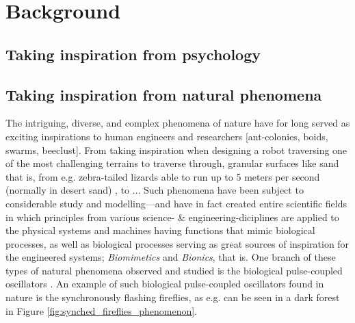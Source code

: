 \chapter{Background}
\label{chap:background}




	 \nl



\section{Taking inspiration from psychology}




	 \nl






\section{Taking inspiration from natural phenomena}
The intriguing, diverse, and complex phenomena of nature have for long served as exciting inspirations to human engineers and researchers [ant-colonies, boids, swarms, beeclust]. From taking inspiration when designing a robot traversing one of the most challenging terrains to traverse through, granular surfaces like sand that is, from e.g. zebra-tailed lizards able to run up to 5 meters per second (normally in desert sand) \cite{sandbots}, to ... Such phenomena have been subject to considerable study and modelling—and have in fact created entire scientific fields \cite{biomimetics, bionics} in which principles from various science- \& engineering-diciplines are applied to the physical systems and machines having functions that mimic biological processes, as well as biological processes serving as great sources of inspiration for the engineered systems; \textit{Biomimetics} and \textit{Bionics}, that is. One branch of these types of natural phenomena observed and studied is the biological pulse-coupled oscillators \cite{russerMinimalAssumptionsReferanser}. An example of such biological pulse-coupled oscillators found in nature is the synchronously flashing fireflies, as e.g. can be seen in a dark forest in Figure \ref{fig:synched_fireflies_phenomenon}.

